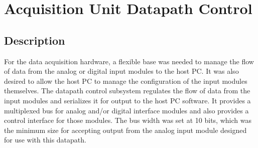 
\section[Datapath Control]{Acquisition Unit Datapath Control}
\subsection{Description}
For the data acquisition hardware, a flexible base was needed to manage the flow of data from the 
analog or digital input modules to the host PC. It was also desired to allow the host PC to manage 
the configuration of the input modules themselves. 
The datapath control subsystem regulates the flow of data from the input modules
 and serializes it for output to the host PC software. It provides a multiplexed bus for analog and/or 
digital interface modules and also provides a control interface for those modules. The bus width was 
set at 10 bits, which was the minimum size for accepting output from the analog input module designed 
for use with this datapath.
